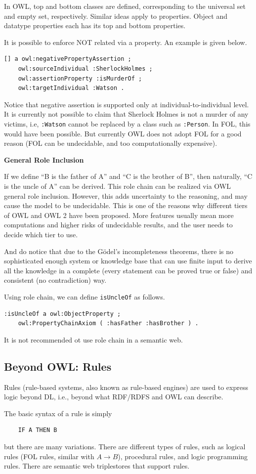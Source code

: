 In OWL, top and bottom classes are defined, corresponding to the universal set and empty set, respectively. Similar ideas apply to properties. Object and datatype properties each has its top and bottom properties.

It is possible to enforce NOT related via a property. An example is given below.
\begin{lstlisting}
[] a owl:negativePropertyAssertion ;
	owl:sourceIndividual :SherlockHolmes ;
	owl:assertionProperty :isMurderOf ;
	owl:targetIndividual :Watson .
\end{lstlisting}
Notice that negative assertion is supported only at individual-to-individual level. It is currently not possible to claim that Sherlock Holmes is not a murder of any victims, i.e, \verb|:Watson| cannot be replaced by a class such as \verb|:Person|. In FOL, this would have been possible. But currently OWL does not adopt FOL for a good reason (FOL can be undecidable, and too computationally expensive).

\vspace{0.1in}
\noindent \textbf{General Role Inclusion}
\vspace{0.1in}

If we define ``B is the father of A'' and ``C is the brother of B'', then naturally, ``C is the uncle of A'' can be derived. This role chain can be realized via OWL general role inclusion. However, this adds uncertainty to the reasoning, and may cause the model to be undecidable. This is one of the reasons why different tiers of OWL and OWL 2 have been proposed. More features usually mean more computations and higher risks of undecidable results, and the user needs to decide which tier to use.

And do notice that due to the G\"odel's incompleteness theorems, there is no sophisticated enough system or knowledge base that can use finite input to derive all the knowledge in a complete (every statement can be proved true or false) and consistent (no contradiction) way.

Using role chain, we can define \verb|isUncleOf| as follows.
\begin{lstlisting}
:isUncleOf a owl:ObjectProperty ;
	owl:PropertyChainAxiom ( :hasFather :hasBrother ) .
\end{lstlisting}

It is not recommended ot use role chain in a semantic web.

\subsection{Beyond OWL: Rules}

Rules (rule-based systems, also known as rule-based engines) are used to express logic beyond DL, i.e., beyond what RDF/RDFS and OWL can describe.

The basic syntax of a rule is simply
\begin{lstlisting}
	IF A THEN B
\end{lstlisting}
but there are many variations. There are different types of rules, such as logical rules (FOL rules, similar with $A\rightarrow B$), procedural rules, and logic programming rules. There are semantic web triplestores that support rules. 